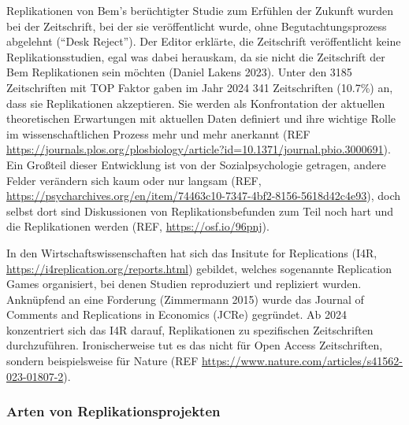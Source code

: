 \documentclass[
  letterpaper,
  DIV=11,
  numbers=noendperiod]{scrreprt}
\begin{document}
Replikationen von Bem's berüchtigter Studie zum Erfühlen der Zukunft
wurden bei der Zeitschrift, bei der sie veröffentlicht wurde, ohne
Begutachtungsprozess abgelehnt (``Desk Reject''). Der Editor erklärte,
die Zeitschrift veröffentlicht keine Replikationsstudien, egal was dabei
herauskam, da sie nicht die Zeitschrift der Bem Replikationen sein
möchten (Daniel Lakens 2023). Unter den 3185 Zeitschriften mit TOP
Faktor gaben im Jahr 2024 341 Zeitschriften (10.7\%) an, dass sie
Replikationen akzeptieren. Sie werden als Konfrontation der aktuellen
theoretischen Erwartungen mit aktuellen Daten definiert und ihre
wichtige Rolle im wissenschaftlichen Prozess mehr und mehr anerkannt
(REF
\url{https://journals.plos.org/plosbiology/article?id=10.1371/journal.pbio.3000691}).
Ein Großteil dieser Entwicklung ist von der Sozialpsychologie getragen,
andere Felder verändern sich kaum oder nur langsam (REF,
\url{https://psycharchives.org/en/item/74463c10-7347-4bf2-8156-5618d42c4e93}),
doch selbst dort sind Diskussionen von Replikationsbefunden zum Teil
noch hart und die Replikationen werden (REF,
\hyperref[0]{https://osf.io/96pnj}).

In den Wirtschaftswissenschaften hat sich das Insitute for Replications
(I4R, \url{https://i4replication.org/reports.html}) gebildet, welches
sogenannte Replication Games organisiert, bei denen Studien reproduziert
und repliziert wurden. Anknüpfend an eine Forderung (Zimmermann 2015)
wurde das Journal of Comments and Replications in Economics (JCRe)
gegründet. Ab 2024 konzentriert sich das I4R darauf, Replikationen zu
spezifischen Zeitschriften durchzuführen. Ironischerweise tut es das
nicht für Open Access Zeitschriften, sondern beispielsweise für Nature
(REF \url{https://www.nature.com/articles/s41562-023-01807-2}).

\subsubsection{Arten von
Replikationsprojekten}\label{arten-von-replikationsprojekten}
\end{document}
